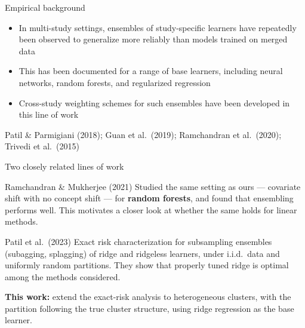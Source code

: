 \documentclass[aspectratio=169,11pt]{beamer}
\begin{document}
\begin{frame}{Empirical background}
  \begin{itemize}
    \item In multi-study settings, ensembles of study-specific learners have repeatedly been observed to generalize more reliably than models trained on merged data
    \item This has been documented for a range of base learners, including neural networks, random forests, and regularized regression
    \item Cross-study weighting schemes for such ensembles have been developed in this line of work
  \end{itemize}
  \vspace{2mm}
  {\small\textcolor{softgray}{Patil \& Parmigiani (2018); Guan et al.\ (2019); Ramchandran et al.\ (2020); Trivedi et al.\ (2015)}}
\end{frame}

\begin{frame}{Two closely related lines of work}
  \begin{block}{\small Ramchandran \& Mukherjee (2021)}
    \small Studied the same setting as ours --- covariate shift with no concept shift --- for \textbf{random forests}, and found that ensembling performs well. This motivates a closer look at whether the same holds for linear methods.
  \end{block}
  \vspace{1mm}
  \begin{block}{\small Patil et al.\ (2023)}
    \small Exact risk characterization for subsampling ensembles (subagging, splagging) of ridge and ridgeless learners, under i.i.d.\ data and uniformly random partitions. They show that properly tuned ridge is optimal among the methods considered.
  \end{block}
  \vspace{2mm}
  \textbf{This work:} extend the exact-risk analysis to heterogeneous clusters, with the partition following the true cluster structure, using ridge regression as the base learner.
\end{frame}
\end{document}
